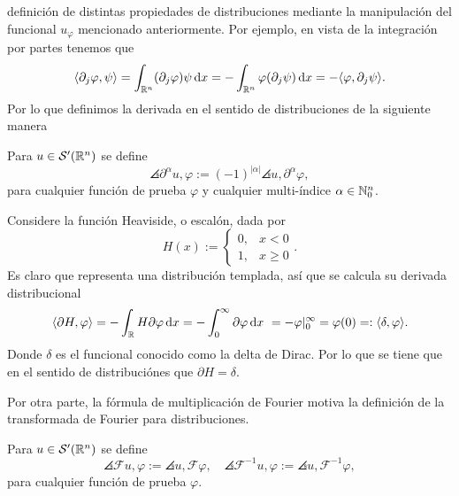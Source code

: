 definición de distintas propiedades de distribuciones mediante la manipulación 
del funcional $u_\varphi$ mencionado anteriormente. Por ejemplo, en vista de
la integración por partes tenemos que 
\begin{equation*}
    \langle\partial_j\varphi, \psi\rangle = \int_{\mathbb{R}^n} (\partial_j\varphi) \psi\mathop{}\!\mathrm{d} x
    = - \int_{\mathbb{R}^n} \varphi(\partial_j \psi)\mathop{}\!\mathrm{d} x = - \langle\varphi,\partial_j
    \psi\rangle.
\end{equation*}
Por lo que definimos la derivada en el sentido de distribuciones de la 
siguiente manera
\begin{definition}
    Para $u\in\mathcal{S}'(\mathbb{R}^n)$ se define
    \begin{equation*}
    	\angles{\partial^\alpha u, \varphi} := (-1)^{|\alpha|} \angles{u, \partial^\alpha\varphi},
    \end{equation*}
    para cualquier función de prueba $\varphi$ y cualquier multi-índice $\alpha\in\mathbb{N}_0^n$. 
\end{definition}
\begin{example}
	Considere la función Heaviside, o escalón, dada por
	\begin{equation*}
		H(x) := \begin{cases} 0, &  x <0 \\
			1,  &x \geq 0\end{cases}.
	\end{equation*}
	Es claro que representa una distribución templada, así que se calcula su derivada distribucional
	\begin{align*}
		\langle\partial H, \varphi\rangle = - \int_{\mathbb{R}} H\partial\varphi\mathop{}\!\mathrm{d} x  = -\int_0^\infty \partial\varphi\mathop{}\!\mathrm{d} x \ = -\varphi|_0^\infty  = \varphi(0) =: \langle\delta, \varphi\rangle.
	\end{align*}
	Donde $\delta$ es el funcional conocido como la delta de Dirac. Por lo que se tiene que en el sentido de distribuciónes que $\partial H = \delta$.
\end{example}
Por otra parte, la fórmula de multiplicación de Fourier motiva la definición de la transformada de Fourier para distribuciones.
\begin{definition}
	Para $u\in\mathcal{S}'(\mathbb{R}^n)$ se define 
	\begin{equation*}
		\angles{\mathcal{F}u, \varphi} := \angles{u, \mathcal{F}\varphi}, \quad 
		\angles{\mathcal{F}^{-1}u, \varphi} := \angles{u, \mathcal{F}^{-1}\varphi},
	\end{equation*}
	para cualquier función de prueba $\varphi$.
\end{definition}
